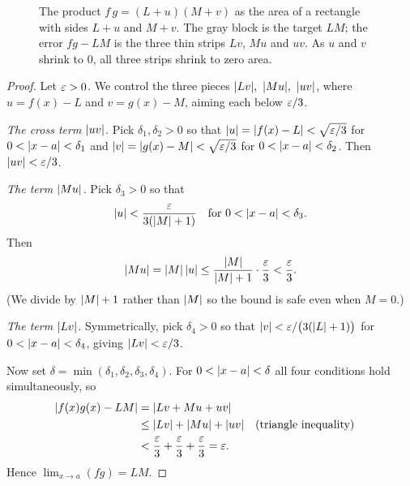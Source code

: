 \begin{figure}[htbp]
\centering
{}
\caption{The product $f\,g=(L+u)(M+v)$ as the area of a rectangle with sides
$L+u$ and $M+v$. The gray block is the target $LM$; the error $fg-LM$ is the
three thin strips $Lv$, $Mu$ and $uv$. As $u$ and $v$ shrink to $0$, all three
strips shrink to zero area.}
\label{ch06:fig-prod-area}
\end{figure}

\begin{proof}
Let $\varepsilon>0$. We control the three pieces $\abs{Lv},\ \abs{Mu},\ \abs{uv}$, where
$u=f(x)-L$ and $v=g(x)-M$, aiming each below $\varepsilon/3$.

\emph{The cross term $\lvert uv\rvert$.} Pick $\delta_1,\delta_2>0$ so that
$\lvert u\rvert=\lvert f(x)-L\rvert<\sqrt{\varepsilon/3}$ for $0<\lvert x-a\rvert<\delta_1$ and
$\lvert v\rvert=\lvert g(x)-M\rvert<\sqrt{\varepsilon/3}$ for $0<\lvert x-a\rvert<\delta_2$. Then
$\lvert uv\rvert<\varepsilon/3$.

\emph{The term $\lvert Mu\rvert$.} Pick $\delta_3>0$ so that
\[
  \lvert u\rvert<\frac{\varepsilon}{3(\lvert M\rvert+1)} \quad\text{for } 0<\lvert x-a\rvert<\delta_3.
\]
Then
\[
  \lvert Mu\rvert = \lvert M\rvert\,\lvert u\rvert
  \le \frac{\lvert M\rvert}{\lvert M\rvert+1}\cdot\frac{\varepsilon}{3} < \frac{\varepsilon}{3}.
\]
(We divide by $\lvert M\rvert+1$ rather than $\lvert M\rvert$ so the bound is safe even when
$M=0$.)

\emph{The term $\lvert Lv\rvert$.} Symmetrically, pick $\delta_4>0$ so that
$\lvert v\rvert<\varepsilon/\bigl(3(\lvert L\rvert+1)\bigr)$ for $0<\lvert x-a\rvert<\delta_4$, giving
$\lvert Lv\rvert<\varepsilon/3$.

Now set $\delta=\min(\delta_1,\delta_2,\delta_3,\delta_4)$. For
$0<\lvert x-a\rvert<\delta$ all four conditions hold simultaneously, so
\begin{align*}
  \lvert f(x)g(x)-LM\rvert &= \lvert Lv + Mu + uv\rvert \\
  &\le \lvert Lv\rvert+\lvert Mu\rvert+\lvert uv\rvert && \text{(triangle inequality)} \\
  &< \frac{\varepsilon}{3}+\frac{\varepsilon}{3}+\frac{\varepsilon}{3} = \varepsilon.
\end{align*}
Hence $\lim_{x\to a}(fg)=LM$.
\end{proof}

